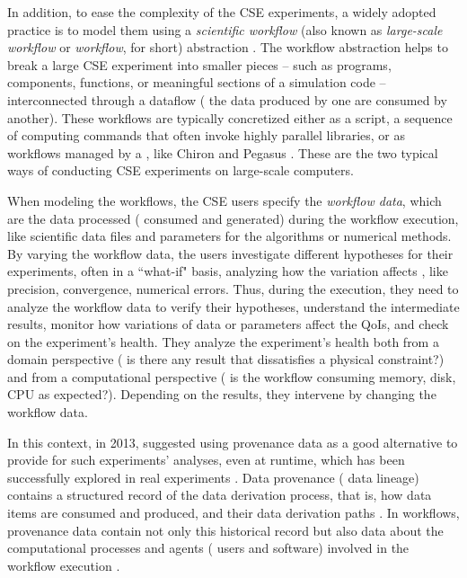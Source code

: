 In addition, to ease the complexity of the CSE experiments, a widely adopted practice is to model them using a \textit{scientific workflow} (also known as \textit{large-scale workflow} or \textit{workflow}, for short) abstraction \cite{F.daSilva2017characterization}.
The workflow abstraction helps to break a large CSE experiment into smaller pieces -- such as programs, components, functions, or meaningful sections of a simulation code -- interconnected through a dataflow (\ie{} the data produced by one are consumed by another).
These workflows are typically concretized either as a script, \ie{} a sequence of computing commands that often invoke highly parallel libraries, or as workflows managed by a ,
like Chiron \cite{Ogasawara2011algebraic} and Pegasus \cite{Deelman2015Pegasus}.
These are the two typical ways of conducting CSE experiments on large-scale computers.


When modeling the workflows, the CSE users specify the \textit{workflow data}, which are the data processed (\ie{} consumed and generated) during the workflow execution, like scientific data files and parameters for the algorithms or numerical methods. By varying the workflow data, the users investigate different hypotheses for their experiments, often in a ``what-if" basis, analyzing how the variation affects , like precision, convergence, numerical errors.
Thus, during the execution, they need to analyze the workflow data to verify their hypotheses, understand the intermediate results, monitor how variations of data or parameters affect the QoIs, and check on the experiment's health.
 They analyze the experiment's health both from a domain perspective (\eg{} is there any result that dissatisfies a physical constraint?) and from a computational perspective (\eg{} is the workflow consuming memory, disk, CPU as expected?). 
 Depending on the results, they intervene by changing the workflow data. 
 
 In this context, in 2013, \citet{mattoso_user-steering_2013} suggested using provenance data as a good alternative to provide for such experiments’ analyses, even at runtime, which has been successfully explored in real experiments  \cite{Mattoso2015Dynamic, silva_adding_2018, Souza2017Data, Dias2015Data-centric, Camata2018In}. 
 Data provenance (\ie{} data lineage) contains a structured record of the data derivation process, that is, how data items are consumed and produced, and their data derivation paths  \cite{herschel_survey_2017}.
 In workflows, provenance data contain not only this historical record but also data about the computational processes and agents (\eg{} users and software) involved in the workflow execution \cite{Costa2013Capturing}.


